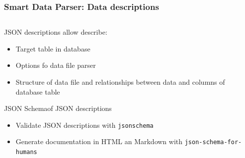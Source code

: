 \documentclass[8pt,pdf,hyperref={unicode}]{beamer}
\begin{document}
\begin{frame}
	\frametitle{Smart Data Parser: Data descriptions}
	\begin{columns}
		\begin{column}{0.5\linewidth}
			JSON descriptions allow describe:
			\begin{itemize}
				\item Target table in database
				\item Options fo data file parser
				\item Structure of data file and relationships between data and columns of database table
			\end{itemize}
			JSON Schema\footnotemark of JSON descriptions
			\begin{itemize}
				\item Validate  JSON descriptions with \texttt{jsonschema}\footnotemark
				\item Generate documentation in HTML an Markdown with \texttt{json-schema-for-humans}\footnotemark
			\end{itemize}
		\end{column}
		\begin{column}{0.5\linewidth}
			
		\end{column}
	\end{columns} 
\end{frame}
\end{document}
